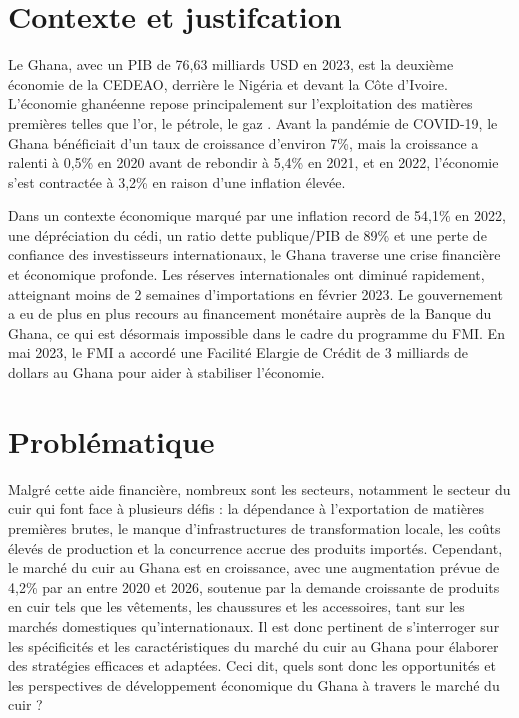 \setcounter{page}{1}
\fancyhead[l]{}

\vspace{0.4cm}
\hspace{0.5cm}
\section*{Contexte et justifcation}
Le Ghana, avec un PIB de 76,63 milliards USD en 2023, est la deuxième économie de la CEDEAO, derrière le Nigéria et devant la Côte d'Ivoire. L'économie ghanéenne repose principalement sur l'exploitation des matières premières telles que l'or, le pétrole, le gaz . Avant la pandémie de COVID-19, le Ghana bénéficiait d'un taux de croissance d'environ 7\%, mais la croissance a ralenti à 0,5\% en 2020 avant de rebondir à 5,4\% en 2021, et en  2022, l'économie s'est contractée à 3,2\% en raison d'une inflation élevée.

\vspace{0.4cm}
Dans un contexte économique marqué par une inflation record de 54,1\% en 2022, une dépréciation du cédi, un ratio dette publique/PIB de 89\% et une perte de confiance des investisseurs internationaux, le Ghana traverse une crise financière et économique profonde. Les réserves internationales ont diminué rapidement, atteignant moins de 2 semaines d'importations en février 2023. Le gouvernement a eu de plus en plus recours au financement monétaire auprès de la Banque du Ghana, ce qui est désormais impossible dans le cadre du programme du FMI. En mai 2023, le FMI a accordé une Facilité Elargie de Crédit de 3 milliards de dollars au Ghana pour aider à stabiliser l'économie.

\vspace{0.4cm}
\section*{Problématique}
	Malgré cette aide financière, nombreux sont les secteurs, notamment le secteur du cuir  qui font face  à plusieurs défis : la dépendance à l’exportation de matières premières brutes, le manque d’infrastructures de transformation locale, les coûts élevés de production et la concurrence accrue des produits importés. Cependant, le marché du cuir au Ghana est en croissance, avec une augmentation prévue de 4,2\% par an entre 2020 et 2026, soutenue par la demande croissante de produits en cuir tels que les vêtements, les chaussures et les accessoires, tant sur les marchés domestiques qu'internationaux. Il est donc pertinent de s'interroger sur les spécificités  et les caractéristiques du marché du cuir au Ghana pour élaborer des stratégies efficaces et adaptées. Ceci dit, quels sont  donc les opportunités et les perspectives  de développement économique du Ghana à travers le marché du cuir ?
